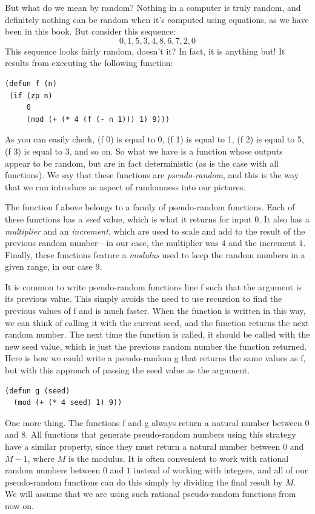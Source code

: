 But what do we mean by random? Nothing in a computer is truly random,
and definitely nothing can be random when it's computed using 
equations, as we have been in this book. But consider this sequence:
$$0, 1, 5, 3, 4, 8, 6, 7, 2, 0$$
This sequence looks fairly random, doesn't it? In fact, it is anything
but! It results from executing the following function:
\begin{Verbatim}
(defun f (n)
 (if (zp n)
     0
     (mod (+ (* 4 (f (- n 1))) 1) 9)))
\end{Verbatim}
As you can easily check, \textsf{(f 0)} is equal to 0, \textsf{(f 1)} 
is equal to 1, \textsf{(f 2)} is equal to 5, \textsf{(f 3)} is equal
to 3, and so on. So what we have is a function whose outputs appear
to be random, but are in fact deterministic (as is the case with all 
functions). We say that these functions are \emph{pseudo-random}, and 
this is the way that we can introduce as aspect of randomness into our
pictures.

The function \textsf{f} above belongs to a family of pseudo-random
functions. Each of these functions has a \emph{seed} value, which is
what it returns for input $0$. It also has a \emph{multiplier} and an \emph{increment},
which are used to scale and add to the result of the previous random
number---in our case, the multiplier was $4$ and the increment $1$.
Finally, these functions feature a \emph{modulus} used to keep the
random numbers in a given range, in our case $9$. 

It is common to write pseudo-random functions line \textsf{f} such 
that the argument is its previous value. This simply avoids the need 
to use recursion to find the previous values of \textsf{f} and is much 
faster. When the function is written in this way, we can think of calling
it with the current seed, and the function returns the next random number.
The next time the function is called, it should be called with the new
seed value, which is just the previous random number the function returned.
Here is how we could write a pseudo-random \textsf{g} that returns the
same values as \textsf{f}, but with this approach of passing the seed
value as the argument.
\begin{Verbatim}
(defun g (seed)
  (mod (+ (* 4 seed) 1) 9))
\end{Verbatim}

One more thing. The functions \textsf{f} and \textsf{g} always return
a natural number between 0 and 8. All functions that generate pseudo-random
numbers using this strategy have a similar property, since they must return
a natural number between 0 and $M-1$, where $M$ is the modulus. It is
often convenient to work with rational random numbers between $0$ and $1$
instead of working with integers, and all of our pseudo-random functions
can do this simply by dividing the final result by $M$. We will assume
that we are using such rational pseudo-random functions from now on.

